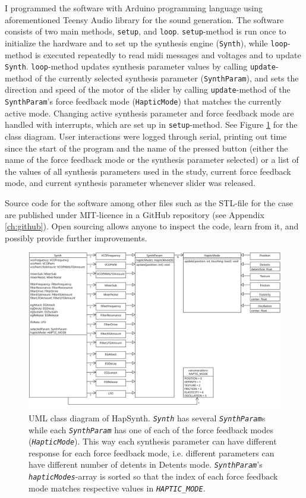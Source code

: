 I programmed the software with Arduino programming language using aforementioned Teensy Audio library for the sound generation. The software consists of two main methods, \texttt{setup}, and \texttt{loop}. \texttt{setup}-method is run once to initialize the hardware and to set up the synthesis engine (\texttt{Synth}), while \texttt{loop}-method is executed repeatedly to read midi messages and voltages and to update \texttt{Synth}. \texttt{loop}-method updates synthesis parameter values by calling \texttt{update}-method of the currently selected synthesis parameter (\texttt{SynthParam}), and sets the direction and speed of the motor of the slider by calling \texttt{update}-method of the \texttt{SynthParam}'s force feedback mode (\texttt{HapticMode}) that matches the currently active mode. Changing active synthesis parameter and force feedback mode are handled with interrupts, which are set up in \texttt{setup}-method. See Figure \ref{classdiagram} for the class diagram. User interactions were logged through serial, printing out time since the start of the program and the name of the pressed button (either the name of the force feedback mode or the synthesis parameter selected) or a list of the values of all synthesis parameters used in the study, current force feedback mode, and current synthesis parameter whenever slider was released.

Source code for the software among other files such as the STL-file for the case are published under MIT-licence in a GitHub repository (see Appendix \ref{ch:github}). Open sourcing allows anyone to inspect the code, learn from it, and possibly provide further improvements.

\begin{figure}[h]
	\centering
	\includegraphics[width=1.0\linewidth]{figures/class-diagram.png}
	\caption{UML class diagram of HapSynth. \emph{\texttt{Synth}} has several \emph{\texttt{SynthParam}}s while each \emph{\texttt{SynthParam}} has one of each of the force feedback modes (\emph{\texttt{HapticMode}}). This way each synthesis parameter can have different response for each force feedback mode, i.e. different parameters can have different number of detents in Detents mode. \emph{\texttt{SynthParam}}'s \emph{\texttt{hapticModes}}-array is sorted so that the index of each force feedback mode matches respective values in \emph{\texttt{HAPTIC\_MODE}}.}
	\label{classdiagram}
\end{figure}

